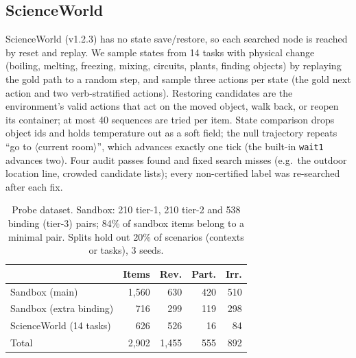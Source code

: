 \documentclass[11pt]{article}
\begin{document}
\subsection{ScienceWorld}
\label{sec:sw}
ScienceWorld \citep{wang2022scienceworld} (v1.2.3) has no state save/restore, so each searched node is reached by reset and replay. We sample states from 14 tasks with physical change (boiling, melting, freezing, mixing, circuits, plants, finding objects) by replaying the gold path to a random step, and sample three actions per state (the gold next action and two verb-stratified actions). Restoring candidates are the environment's valid actions that act on the moved object, walk back, or reopen its container; at most 40 sequences are tried per item. State comparison drops object ids and holds temperature out as a soft field; the null trajectory repeats ``go to $\langle$current room$\rangle$'', which advances exactly one tick (the built-in \texttt{wait1} advances two). Four audit passes found and fixed search misses (e.g.\ the outdoor location line, crowded candidate lists); every non-certified label was re-searched after each fix.

\begin{table}[t]
\centering\small
\begin{tabular}{lrrrr}
\toprule
 & Items & Rev. & Part. & Irr. \\
\midrule
Sandbox (main) & 1,560 & 630 & 420 & 510 \\
Sandbox (extra binding) & 716 & 299 & 119 & 298 \\
ScienceWorld (14 tasks) & 626 & 526 & 16 & 84 \\
\midrule
Total & 2,902 & 1,455 & 555 & 892 \\
\bottomrule
\end{tabular}
\caption{Probe dataset. Sandbox: 210 tier-1, 210 tier-2 and 538 binding (tier-3) pairs; 84\% of sandbox items belong to a minimal pair. Splits hold out 20\% of scenarios (contexts or tasks), 3 seeds.}
\label{tab:data}
\end{table}
\end{document}
